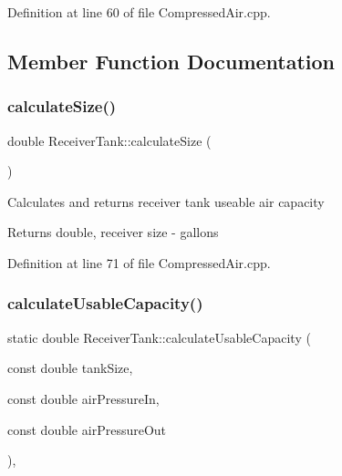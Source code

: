 Definition at line 60 of file Compressed\+Air.\+cpp.



\subsection{Member Function Documentation}
\mbox{\label{class_receiver_tank_a5841344b63c444e4ceb9c3b7daeaf613}} 
\subsubsection{\texorpdfstring{calculate\+Size()}{calculateSize()}}
{\footnotesize\ttfamily double Receiver\+Tank\+::calculate\+Size (\begin{DoxyParamCaption}{ }\end{DoxyParamCaption})}

Calculates and returns receiver tank useable air capacity \begin{DoxyReturn}{Returns}
double, receiver size -\/ gallons 
\end{DoxyReturn}


Definition at line 71 of file Compressed\+Air.\+cpp.

\mbox{\label{class_receiver_tank_ad17f86b7de728d4796ee5b9663dcc577}} 
\subsubsection{\texorpdfstring{calculate\+Usable\+Capacity()}{calculateUsableCapacity()}}
{\footnotesize\ttfamily static double Receiver\+Tank\+::calculate\+Usable\+Capacity (\begin{DoxyParamCaption}\item[{const double}]{tank\+Size,  }\item[{const double}]{air\+Pressure\+In,  }\item[{const double}]{air\+Pressure\+Out }\end{DoxyParamCaption})\hspace{0.3cm}{\ttfamily [inline]}, {\ttfamily [static]}}

